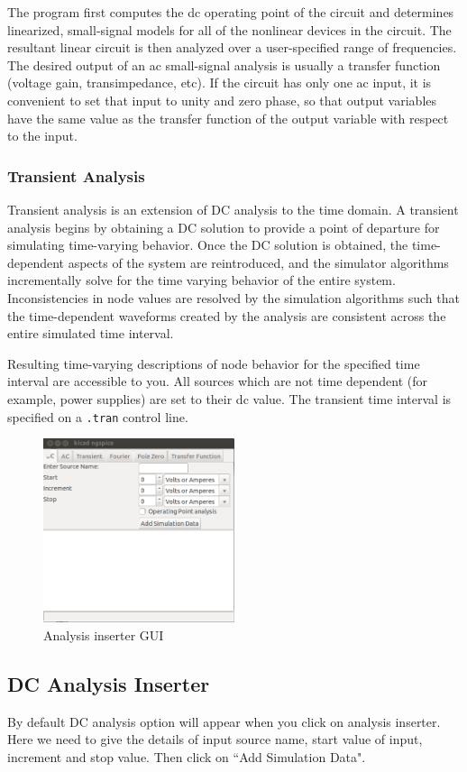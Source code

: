 The program first computes the dc operating point of the circuit and determines linearized, small-signal models for all of the nonlinear devices in the circuit. The resultant linear circuit is then analyzed over a user-specified range of frequencies. The desired output of an ac small-signal analysis is usually a transfer function (voltage gain, transimpedance, etc). If the circuit has only one ac input, it is convenient to set that input to unity and zero phase, so that output variables have the same value as the transfer function of the output variable with respect to the input.
\subsubsection{Transient Analysis}
Transient analysis is an extension of DC analysis to the time domain. A transient analysis begins by obtaining a DC solution to provide a point of departure for simulating time-varying behavior. Once the DC solution is obtained, the time-dependent aspects of the system are reintroduced, and the simulator algorithms incrementally solve for the time varying behavior of the entire system. Inconsistencies in node values are resolved by the simulation algorithms such that the time-dependent waveforms created by the analysis are consistent across the entire simulated time interval.

 Resulting time-varying descriptions of node behavior for the specified time interval are accessible to you. All sources which are not time dependent (for example, power supplies) are set to their dc value. The transient time interval is specified on a {\tt .tran} control line. 


\begin{figure}[t]
\centering
\includegraphics[width=0.5\textwidth]{figures/1}
\caption{Analysis inserter GUI}
\label{1}
\end{figure}
\subsection{DC Analysis Inserter}
By default DC analysis option will appear when you click on analysis inserter. Here we need to give the details of input source name, start value of input, increment and  stop value. Then click on ``Add Simulation Data". 


